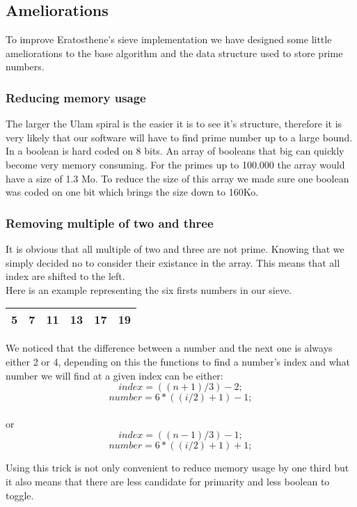 \subsection{Ameliorations}

To improve Eratosthene's sieve implementation we have designed some little ameliorations to the base algorithm and the data structure used to store prime numbers.

\subsubsection{Reducing memory usage}
The larger the Ulam spiral is the easier it is to see it's structure, therefore it is very likely that our software will have to find prime number up to a large bound.\\In \CXX a boolean is hard coded on 8 bits. An array of booleans that big can quickly become very memory consuming. For the primes up to 100.000 the array would have a size of 1.3 Mo. To reduce the size of this array we made sure one boolean was coded on one bit which brings the size down to 160Ko.

\subsubsection{Removing multiple of two and three }
It is obvious that all multiple of two and three are not prime. Knowing that we simply decided no to consider their existance in the array. This means that all index are shifted to the left.\\ Here is an example representing the six firsts numbers in our sieve.

\begin{center}
   \begin{tabular}{ |*{6}{c|} }
     \hline
     5 & 7 & 11 & 13 & 17 & 19 \\ \hline
     
   \end{tabular}
\end{center}  

 We noticed that the difference between a number and the next one is always either 2 or 4, depending on this the functions to find a number's index and what number we will find at a given index can be either: $$index = ((n + 1) / 3) - 2;$$ $$number = 6 * ((i / 2) + 1) - 1;$$ \\or $$index = ((n - 1) / 3) - 1;$$ $$number = 6 * ((i / 2) + 1) + 1;$$

Using this trick is not only convenient to reduce memory usage by one third but it also means that there are less candidate for primarity and less boolean to toggle. 



